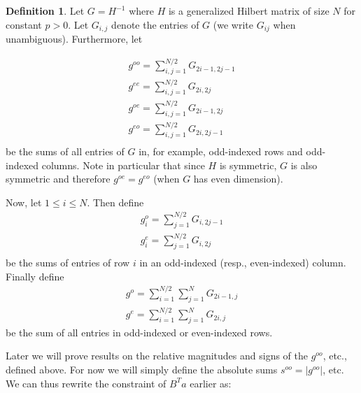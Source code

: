 \documentclass[11pt]{article}
\theoremstyle{definition}
\newtheorem{defn}[thm]{Definition}
\theoremstyle{remark}
\numberwithin{equation}{section}
\begin{document}
\begin{defn}
Let $G=H^{-1}$ where $H$ is a generalized Hilbert matrix of size $N$ for constant $p > 0$. Let $G_{i,j}$ denote the entries of $G$ (we write $G_{ij}$ when unambiguous). Furthermore, let 

\begin{align*} 
g^{oo} = \sum_{i,j=1}^ {N/2}  G_{2i-1, 2j-1} \\
g^{ee} = \sum_{i,j=1}^ {N/2}  G_{2i, 2j} \\
g^{oe} = \sum_{i,j=1}^ {N/2}  G_{2i-1, 2j} \\
g^{eo} = \sum_{i,j=1}^ {N/2}  G_{2i, 2j-1} \\
\end{align*} be the sums of all entries of $G$ in, for example, odd-indexed rows and odd-indexed columns. Note in particular that since $H$ is symmetric, $G$ is also symmetric and therefore $g^{oe} = g^{eo}$ (when $G$ has even dimension). 

Now, let $1 \le i \le N$. Then define 
\begin{align*}
g_i^o= \sum_{j=1}^{N/2} G_{i, 2j-1} \\
g_i^e= \sum_{j=1}^{N/2} G_{i, 2j} \\
\end{align*} be the sums of entries of row $i$ in an odd-indexed (resp., even-indexed) column. 
Finally define 
\begin{align*}
g^o = \sum_{i=1}^{N/2} \sum_{j=1}^N G_{2i-1, j}\\
g^e = \sum_{i=1}^{N/2} \sum_{j=1}^N G_{2i, j}
\end{align*} be the sum of all entries in odd-indexed or even-indexed rows.
\end{defn} 

Later we will prove results on the relative magnitudes and signs of the $g^{oo}$, etc., defined above. For now we will simply define the absolute sums $s^{oo} = | g^{oo}|$, etc.\\

We can thus rewrite the constraint of $B^Ta$ earlier as:
\end{document}
